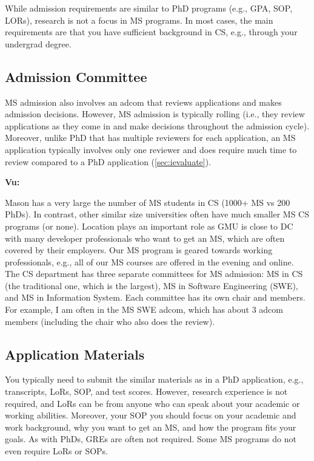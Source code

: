 \documentclass[oneside,11pt,dvipsnames]{book}
\newenvironment{commentbox}[1][]{
  \small
  \begin{mybox}
    {\small \textbf{#1}}
  }{
  \end{mybox}
}
\begin{document}
While admission requirements are similar to PhD programs (e.g., GPA, SOP, LORs), research is not a focus in MS programs. In most cases, the main requirements are that you have sufficient background in CS, e.g., through your undergrad degree.

\subsection{Admission Committee}\label{sec:ms-adcom}
MS admission also involves an adcom that reviews applications and makes admission decisions. However, MS admission is typically rolling (i.e., they review applications as they come in and make decisions throughout the admission cycle).  Moreover, unlike PhD that has multiple reviewers for each application, an MS application typically involves only one reviewer and does require much time to review compared to a PhD application (\autoref{sec:ievaluate}). 

\begin{commentbox}[Vu:]
    Mason has a very large the number of MS students in CS (1000+ MS vs 200 PhDs). In contrast, other similar size universities often have much smaller MS CS programs (or none). Location plays an important role as GMU is close to DC with many developer professionals who want to get an MS, which are often covered by their employers.  Our MS program is geared towards working professionals, e.g., all of our MS courses are offered in the evening and online.
    \\
    
    The CS department has three separate committees for MS admission: MS in CS (the traditional one, which is the largest), MS in Software Engineering (SWE), and MS in Information System. 
    Each committee has its own chair and members. For example, I am often in the MS SWE adcom, which has about 3 adcom members (including the chair who also does the review). 
\end{commentbox}





\subsection{Application Materials}

You typically need to submit the similar materials as in a PhD application, e.g., transcripts, LoRs, SOP, and test scores.  However, research experience is not required, and LoRs can be from anyone who can speak about your academic or working abilities. Moreover, your SOP you should focus on your academic and work background, why you want to get an MS, and how the program fits your goals. As with PhDs, GREs are often not required. Some MS programs do not even require LoRs or SOPs.  
\end{document}
